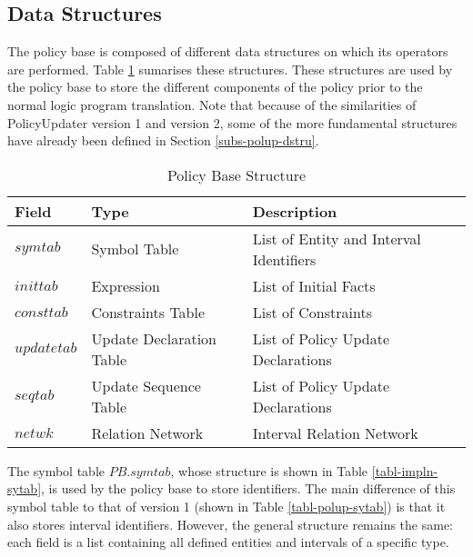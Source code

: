\documentclass[11pt]{report}
\begin{document}
      \subsection{Data Structures}
        \label{subs-impln-dstru}

        The policy base is composed of different data structures on which
        its operators are performed. Table \ref{tabl-impln-polba} sumarises
        these structures. These structures are used by the policy base to
        store the different components of the policy prior to the normal logic
        program translation. Note that because of the similarities of
        PolicyUpdater version 1 and version 2, some of the more fundamental
        structures have already been defined in Section \ref{subs-polup-dstru}.

        \begin{table}[tbhp]
          \begin{center}
            \begin{tabular}[t]{|l|l|l|}
              \hline
              {\bf Field} & {\bf Type}               & {\bf Description} \\
              \hline                                 
              $symtab$    & Symbol Table             & List of Entity and Interval Identifiers \\
              \hline                                 
              $inittab$   & Expression               & List of Initial Facts \\
              \hline                                 
              $consttab$  & Constraints Table        & List of Constraints \\
              \hline
              $updatetab$ & Update Declaration Table & List of Policy Update Declarations \\
              \hline
              $seqtab$    & Update Sequence Table    & List of Policy Update Declarations \\
              \hline
              $netwk$     & Relation Network         & Interval Relation Network \\
              \hline
            \end{tabular}
          \end{center}
          \caption{Policy Base Structure}
          \label{tabl-impln-polba}
        \end{table}

        The symbol table $PB$.$symtab$, whose structure is shown in Table
        \ref{tabl-impln-sytab}, is used by the policy base to store
        identifiers. The main difference of this symbol table to that of
        version 1 (shown in Table \ref{tabl-polup-sytab}) is that it also
        stores interval identifiers. However, the general structure remains
        the same: each field is a list containing all defined entities and
        intervals of a specific type.
\end{document}
